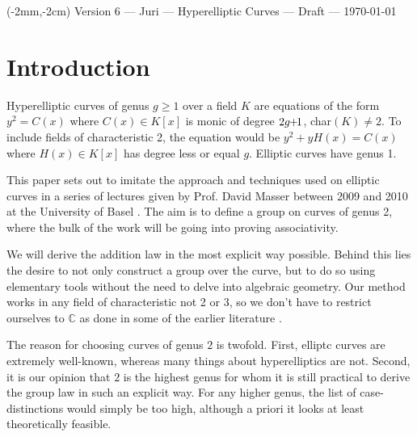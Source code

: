 \documentclass[english,11pt,a4paper]{article}
\begin{document}



\begin{textblock*}{360pt}(-2mm,-2cm)
  Version 6 \scriptsize \hfill --- Juri --- Hyperelliptic Curves --- Draft --- \today
  \normalsize
\end{textblock*}
\vspace{-1.5cm}


\tableofcontents
\newpage

\section{Introduction}

Hyperelliptic curves of genus $g \geq 1$ over a field $K$ are equations of the form $y^2 = C(x)$ where $C(x) \in K[x]$ is monic of degree $2g \hspace{-1mm} + \hspace{-1.2mm} 1$, \mbox{char$(K) \neq 2$}. To include fields of characteristic 2, the equation would be $y^2 + y H(x) = C(x)$ where $H(x) \in K[x]$ has degree less or equal $g$. Elliptic curves have genus 1.

This paper sets out to imitate the approach and techniques used on elliptic curves in a series of lectures given by Prof. David Masser between 2009 and 2010 at the University of Basel \cite{masser}. The aim is to define a group on curves of genus 2, where the bulk of the work will be going into proving associativity.

We will derive the addition law in the most explicit way possible. Behind this lies the desire to not only construct a group over the curve, but to do so using elementary tools without the need to delve into algebraic geometry. Our method works in any field of characteristic not 2 or 3, so we don't have to restrict ourselves to $\mathds{C}$ as done in some of the earlier literature \cite{mumf}.

The reason for choosing curves of genus $2$ is twofold. First, elliptc curves are extremely well-known, whereas many things about hyperelliptics are not. Second, it is our opinion that $2$ is the highest genus for whom it is still practical to derive the group law in such an explicit way. For any higher genus, the list of case-distinctions would simply be too high, although a priori it looks at least theoretically feasible. %
\end{document}
